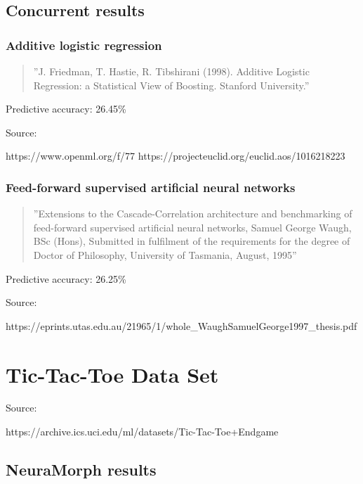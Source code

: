 \documentclass[8pt, a4paper]{article}
\begin{document}
\subsection{Concurrent results}

\subsubsection{Additive logistic regression}

\begin{quote}
''J. Friedman, T. Hastie, R. Tibshirani (1998). Additive Logistic Regression: a Statistical View of Boosting. Stanford University.''
\end{quote}

Predictive accuracy: 26.45\%

Source:

https://www.openml.org/f/77
https://projecteuclid.org/euclid.aos/1016218223


\subsubsection{Feed-forward supervised artificial neural
networks}

\begin{quote}
''Extensions to the Cascade-Correlation architecture and
benchmarking of feed-forward supervised artificial neural
networks, Samuel George Waugh, BSc (Hons), Submitted in fulfilment of the requirements for the degree of Doctor of Philosophy, University of Tasmania, August, 1995''
\end{quote}

Predictive accuracy: 26.25\%

Source:

https://eprints.utas.edu.au/21965/1/whole_WaughSamuelGeorge1997_thesis.pdf





\newpage
\section{Tic-Tac-Toe Data Set}

Source: 

https://archive.ics.uci.edu/ml/datasets/Tic-Tac-Toe+Endgame

\subsection{NeuraMorph results}
\end{document}
